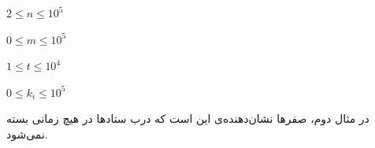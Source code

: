 \documentclass[11.5pt,a4paper,oneside]{article}
\begin{document}
\begin{problem}
\constraints
\begin{shortitems}
\item $2 \le n \le 10^5$
\item $0 \le m \le 10^5$
\item $1 \le t \le 10^4$
\item $0 \le k_{i} \le 10^5$
\end{shortitems}

\sampleIO

\begin{example}
%
\end{example}

\begin{example}
%
\end{example}


\sampleIODescription
در مثال دوم،‌ صفر‌ها نشان‌دهنده‌ی این است که درب ستاد‌ها در هیچ زمانی بسته نمی‌شود.

\end{problem}
\end{document}
